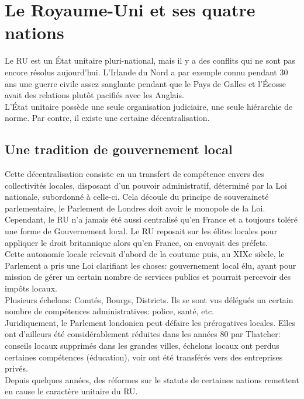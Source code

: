 \documentclass[10pt, a4paper, openany]{book}
\begin{document}
\section{Le Royaume-Uni et ses quatre nations}

Le RU est un État unitaire pluri-national, mais il y a des conflits qui ne sont pas encore résolus aujourd'hui. L'Irlande du Nord a par exemple connu pendant 30 ans une guerre civile assez sanglante pendant que le Pays de Galles et l'Écosse avait des relations plutôt pacifiés avec les Anglais. \\
L'État unitaire possède une seule organisation judiciaire, une seule hiérarchie de norme. Par contre, il existe une certaine décentralisation.

\subsection{Une tradition de gouvernement local}

Cette décentralisation consiste en un transfert de compétence envers des collectivités locales, disposant d'un pouvoir administratif, déterminé par la Loi nationale, subordonné à celle-ci. Cela découle du principe de souveraineté parlementaire, le Parlement de Londres doit avoir le monopole de la Loi. Cependant, le RU n'a jamais été aussi centralisé qu'en France et a toujours toléré une forme de Gouvernement local. Le RU reposait sur les élites locales pour appliquer le droit britannique alors qu'en France, on envoyait des préfets. \\
Cette autonomie locale relevait d'abord de la coutume puis, au XIXe siècle, le Parlement a pris une Loi clarifiant les choses: gouvernement local élu, ayant pour mission de gérer un certain nombre de services publics et pourrait percevoir des impôts locaux. \\
Plusieurs échelons: Comtés, Bourgs, Districts. Ils se sont vus délégués un certain nombre de compétences administratives: police, santé, etc. \\
Juridiquement, le Parlement londonien peut défaire les prérogatives locales. Elles ont d'ailleurs été considérablement réduites dans les années 80 par Thatcher: conseils locaux supprimés dans les grandes villes, échelons locaux ont perdus certaines compétences (éducation), voir ont été transférés vers des entreprises privés. \\
Depuis quelques années, des réformes sur le statuts de certaines nations remettent en cause le caractère unitaire du RU.
\end{document}
